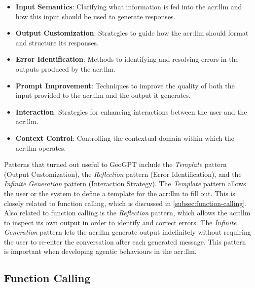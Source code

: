 \begin{itemize}
    \item \textbf{Input Semantics}: Clarifying what information is fed into the \acrshort{acr:llm} and how this input should be used to generate responses.
    \item \textbf{Output Customization}: Strategies to guide how the \acrshort{acr:llm} should format and structure its responses.
    \item \textbf{Error Identification}: Methods to identifying and resolving errors in the outputs produced by the \acrshort{acr:llm}.
    \item \textbf{Prompt Improvement}: Techniques to improve the quality of both the input provided to the \acrshort{acr:llm} and the output it generates.
    \item \textbf{Interaction}: Strategies for enhancing interactions between the user and the \acrshort{acr:llm}.
    \item \textbf{Context Control}: Controlling the contextual domain within which the \acrshort{acr:llm} operates.
\end{itemize}

Patterns that turned out useful to GeoGPT include the \textit{Template} pattern (Output Customization), the \textit{Reflection} pattern (Error Identification), and the \textit{Infinite Generation} pattern (Interaction Strategy). The \textit{Template} pattern allows the user or the system to define a template for the \acrshort{acr:llm} to fill out. This is closely related to function calling, which is discussed in \autoref{subsec:function-calling}. Also related to function calling is the \textit{Reflection} pattern, which allows the \acrshort{acr:llm} to inspect its own output in order to identify and correct errors. The \textit{Infinite Generation} pattern lets the \acrshort{acr:llm} generate output indefinitely without requiring the user to re-enter the conversation after each generated message. This pattern is important when developing agentic behaviours in the \acrshort{acr:llm}.


\subsection[Function Calling LLMs]{Function Calling }
\label{subsec:function-calling}

